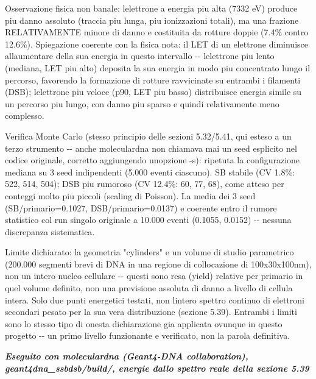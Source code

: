 \documentclass[
  italian,
]{article}
\begin{document}
Osservazione fisica non banale: l\textquotesingle elettrone a energia piu\textquotesingle{} alta (7332 eV) produce piu\textquotesingle{} danno assoluto (traccia piu\textquotesingle{} lunga, piu\textquotesingle{} ionizzazioni totali), ma una frazione RELATIVAMENTE minore di danno e\textquotesingle{} costituita da rotture doppie (7.4\% contro 12.6\%). Spiegazione coerente con la fisica nota: il LET di un elettrone diminuisce all\textquotesingle aumentare della sua energia in questo intervallo -\/- l\textquotesingle elettrone piu\textquotesingle{} lento (mediana, LET piu\textquotesingle{} alto) deposita la sua energia in modo piu\textquotesingle{} concentrato lungo il percorso, favorendo la formazione di rotture ravvicinate su entrambi i filamenti (DSB); l\textquotesingle elettrone piu\textquotesingle{} veloce (p90, LET piu\textquotesingle{} basso) distribuisce energia simile su un percorso piu\textquotesingle{} lungo, con danno piu\textquotesingle{} sparso e quindi relativamente meno complesso.

Verifica Monte Carlo (stesso principio delle sezioni 5.32/5.41, qui esteso a un terzo strumento -\/- anche moleculardna non chiamava mai un seed esplicito nel codice originale, corretto aggiungendo un\textquotesingle opzione -s): ripetuta la configurazione mediana su 3 seed indipendenti (5.000 eventi ciascuno). SB stabile (CV 1.8\%: 522, 514, 504); DSB piu\textquotesingle{} rumoroso (CV 12.4\%: 60, 77, 68), come atteso per conteggi molto piu\textquotesingle{} piccoli (scaling di Poisson). La media dei 3 seed (SB/primario=0.1027, DSB/primario=0.0137) e\textquotesingle{} coerente entro il rumore statistico col run singolo originale a 10.000 eventi (0.1055, 0.0152) -\/- nessuna discrepanza sistematica.

Limite dichiarato: la geometria "cylinders" e\textquotesingle{} un volume di studio parametrico (200.000 segmenti brevi di DNA in una regione di collocazione di 100x30x100nm), non un intero nucleo cellulare -\/- questi sono resa (yield) relative per primario in quel volume definito, non una previsione assoluta di danno a livello di cellula intera. Solo due punti energetici testati, non l\textquotesingle intero spettro continuo di elettroni secondari pesato per la sua vera distribuzione (sezione 5.39). Entrambi i limiti sono lo stesso tipo di onesta\textquotesingle{} dichiarazione gia\textquotesingle{} applicata ovunque in questo progetto -\/- un primo livello funzionante e verificato, non la parola definitiva.

\emph{\textbf{Eseguito con moleculardna (Geant4-DNA collaboration), geant4dna\_\allowbreak{}ssbdsb/build/, energie dallo spettro reale della sezione 5.39}}
\end{document}
